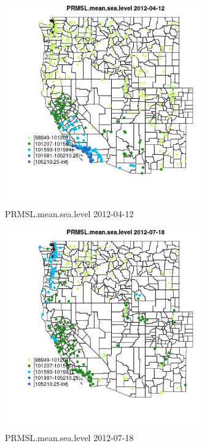 \begin{figure} 
\centering  
\includegraphics[width=0.77\textwidth]{Code_Outputs/Report_ML_input_PM25_Step4_part_e_de_duplicated_aves_compiled_2019-05-14wNAs_MapObsPRMSLmeansealevel2012-04-12.jpg} 
\caption{\label{fig:Report_ML_input_PM25_Step4_part_e_de_duplicated_aves_compiled_2019-05-14wNAsMapObsPRMSLmeansealevel2012-04-12}PRMSL.mean.sea.level 2012-04-12} 
\end{figure} 
 

\begin{figure} 
\centering  
\includegraphics[width=0.77\textwidth]{Code_Outputs/Report_ML_input_PM25_Step4_part_e_de_duplicated_aves_compiled_2019-05-14wNAs_MapObsPRMSLmeansealevel2012-07-18.jpg} 
\caption{\label{fig:Report_ML_input_PM25_Step4_part_e_de_duplicated_aves_compiled_2019-05-14wNAsMapObsPRMSLmeansealevel2012-07-18}PRMSL.mean.sea.level 2012-07-18} 
\end{figure} 
 

